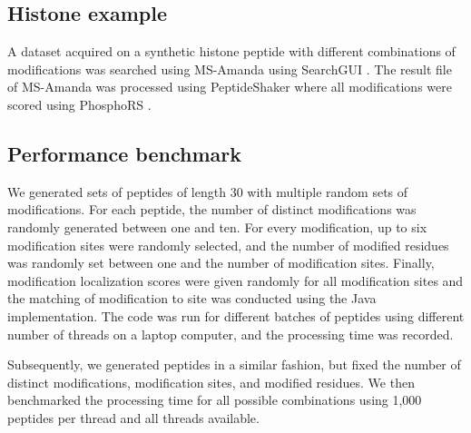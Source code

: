 \documentclass[]{article}
\begin{document}


\subsection{Histone example}

A dataset acquired on a synthetic histone peptide with different combinations of modifications was searched using MS-Amanda \cite{MS_Amanda} using SearchGUI \cite{SearchGUI}. The result file of MS-Amanda was processed using PeptideShaker where all modifications were scored using PhosphoRS \cite{PhosphoRS}.


\subsection{Performance benchmark}

We generated sets of peptides of length 30 with multiple random sets of modifications. For each peptide, the number of distinct modifications was randomly generated between one and ten. For every modification, up to six modification sites were randomly selected, and the number of modified residues was randomly set between one and the number of modification sites. Finally, modification localization scores were given randomly for all modification sites and the matching of modification to site was conducted using the Java implementation. The code was run for different batches of peptides using different number of threads on a laptop computer, and the processing time was recorded. 

Subsequently, we generated peptides in a similar fashion, but fixed the number of distinct modifications, modification sites, and modified residues. We then benchmarked the processing time for all possible combinations using 1,000 peptides per thread and all threads available.
\end{document}
